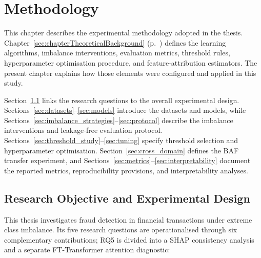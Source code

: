 ﻿\chapter{Methodology}
\label{sec:chapterMethodology}

This chapter describes the experimental methodology adopted in the thesis. Chapter~\ref{sec:chapterTheoreticalBackground} (p.~\pageref{sec:chapterTheoreticalBackground}) defines the learning algorithms, imbalance interventions, evaluation metrics, threshold rules, hyperparameter optimisation procedure, and feature-attribution estimators. The present chapter explains how those elements were configured and applied in this study.

Section~\ref{sec:objective} links the research questions to the overall experimental design. Sections~\ref{sec:datasets}--\ref{sec:models} introduce the datasets and models, while Sections~\ref{sec:imbalance_strategies}--\ref{sec:protocol} describe the imbalance interventions and leakage-free evaluation protocol. Sections~\ref{sec:threshold_study}--\ref{sec:tuning} specify threshold selection and hyperparameter optimisation. Section~\ref{sec:cross_domain} defines the BAF transfer experiment, and Sections~\ref{sec:metrics}--\ref{sec:interpretability} document the reported metrics, reproducibility provisions, and interpretability analyses.

\section{Research Objective and Experimental Design}
\label{sec:objective}

This thesis investigates fraud detection in financial transactions under extreme class imbalance. Its five research questions are operationalised through six complementary contributions; RQ5 is divided into a SHAP consistency analysis and a separate FT-Transformer attention diagnostic:


